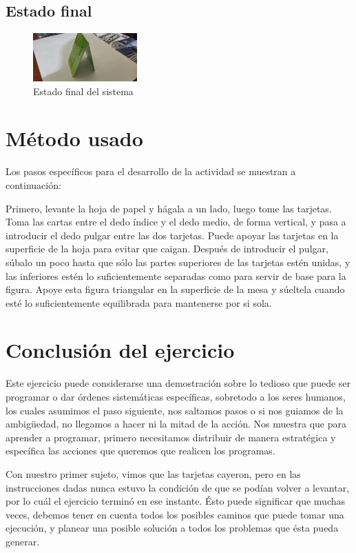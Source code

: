 \documentclass{article}
\begin{document}
\subsection{Estado final}
\begin{figure}[h]
\includegraphics[width=4cm]{final.jpeg}
\centering
\caption{Estado final del sistema}
\label{fig:cpplogo}
\end{figure}
\newpage


\section{Método usado} \label{contenido}
Los pasos específicos para el desarrollo de la actividad se muestran a continuación:

Primero, levante la hoja de papel y hágala a un lado, luego tome las tarjetas. Toma las cartas entre el dedo índice y el dedo medio, de forma vertical, y pasa a introducir el dedo pulgar entre las dos tarjetas. Puede apoyar las tarjetas en la superficie de la hoja para evitar que caigan. Después de introducir el pulgar, súbalo un poco hasta que sólo las partes superiores de las tarjetas estén unidas, y las inferiores estén lo suficientemente separadas como para servir de base para la figura. Apoye esta figura triangular en la superficie de la mesa y súeltela cuando esté lo suficientemente equilibrada para mantenerse por si sola.

\section{Conclusión del ejercicio} 
Este ejercicio puede considerarse una demostración sobre lo tedioso que puede ser programar o dar órdenes sistemáticas específicas, sobretodo a los seres humanos, los cuales asumimos el paso siguiente, nos saltamos pasos o si nos guiamos de la ambigüedad, no llegamos a hacer ni la mitad de la acción. Nos muestra que para aprender a programar, primero necesitamos distribuir de manera estratégica y específica las acciones que queremos que realicen los programas.

Con nuestro primer sujeto, vimos que las tarjetas cayeron, pero en las instrucciones dadas nunca estuvo la condición de que se podían volver a levantar, por lo cuál el ejercicio terminó en ese instante. Ésto puede significar que muchas veces, debemos tener en cuenta todos los posibles caminos que puede tomar una ejecución, y planear una posible solución a todos los problemas que ésta pueda generar.
\end{document}
